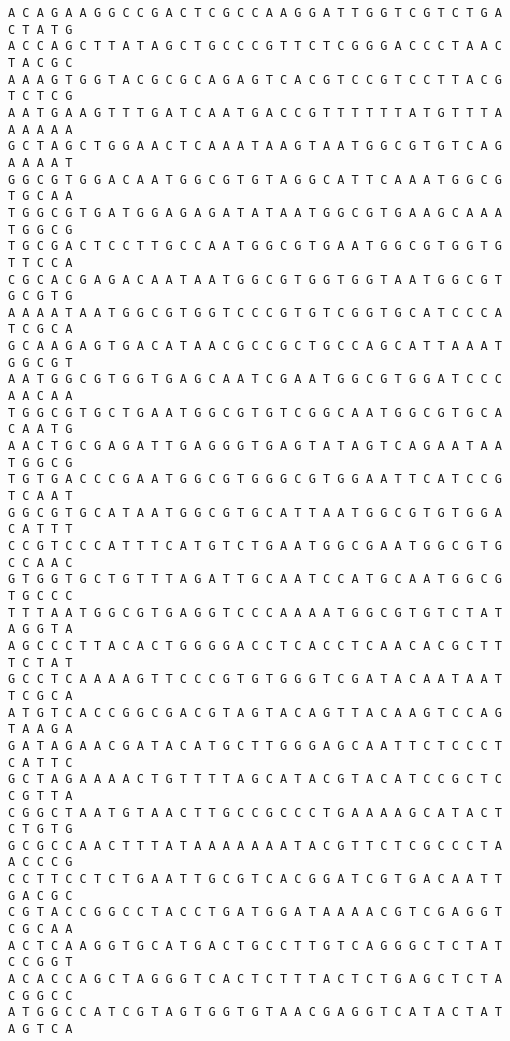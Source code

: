 \documentclass[11pt]{article}
\begin{document}
    \begin{Verbatim}[commandchars=\\\{\}]
A C A G A A G G C C G A C T C G C C A A G G A T T G G T C G T C T G A C T A T G
A C C A G C T T A T A G C T G C C C G T T C T C G G G A C C C T A A C T A C G C
A A A G T G G T A C G C G C A G A G T C A C G T C C G T C C T T A C G T C T C G
A A T G A A G T T T G A T C A A T G A C C G T T T T T T A T G T T T A A A A A A
G C T A G C T G G A A C T C A A A T A A G T A A T G G C G T G T C A G A A A A T
G G C G T G G A C A A T G G C G T G T A G G C A T T C A A A T G G C G T G C A A
T G G C G T G A T G G A G A G A T A T A A T G G C G T G A A G C A A A T G G C G
T G C G A C T C C T T G C C A A T G G C G T G A A T G G C G T G G T G T T C C A
C G C A C G A G A C A A T A A T G G C G T G G T G G T A A T G G C G T G C G T G
A A A A T A A T G G C G T G G T C C C G T G T C G G T G C A T C C C A T C G C A
G C A A G A G T G A C A T A A C G C C G C T G C C A G C A T T A A A T G G C G T
A A T G G C G T G G T G A G C A A T C G A A T G G C G T G G A T C C C A A C A A
T G G C G T G C T G A A T G G C G T G T C G G C A A T G G C G T G C A C A A T G
A A C T G C G A G A T T G A G G G T G A G T A T A G T C A G A A T A A T G G C G
T G T G A C C C G A A T G G C G T G G G C G T G G A A T T C A T C C G T C A A T
G G C G T G C A T A A T G G C G T G C A T T A A T G G C G T G T G G A C A T T T
C C G T C C C A T T T C A T G T C T G A A T G G C G A A T G G C G T G C C A A C
G T G G T G C T G T T T A G A T T G C A A T C C A T G C A A T G G C G T G C C C
T T T A A T G G C G T G A G G T C C C A A A A T G G C G T G T C T A T A G G T A
A G C C C T T A C A C T G G G G A C C T C A C C T C A A C A C G C T T T C T A T
G C C T C A A A A G T T C C C G T G T G G G T C G A T A C A A T A A T T C G C A
A T G T C A C C G G C G A C G T A G T A C A G T T A C A A G T C C A G T A A G A
G A T A G A A C G A T A C A T G C T T G G G A G C A A T T C T C C C T C A T T C
G C T A G A A A A C T G T T T T A G C A T A C G T A C A T C C G C T C C G T T A
C G G C T A A T G T A A C T T G C C G C C C T G A A A A G C A T A C T C T G T G
G C G C C A A C T T T A T A A A A A A A T A C G T T C T C G C C C T A A C C C G
C C T T C C T C T G A A T T G C G T C A C G G A T C G T G A C A A T T G A C G C
C G T A C C G G C C T A C C T G A T G G A T A A A A C G T C G A G G T C G C A A
A C T C A A G G T G C A T G A C T G C C T T G T C A G G G C T C T A T C C G G T
A C A C C A G C T A G G G T C A C T C T T T A C T C T G A G C T C T A C G G C C
A T G G C C A T C G T A G T G G T G T A A C G A G G T C A T A C T A T A G T C A

\end{Verbatim}
\end{document}
